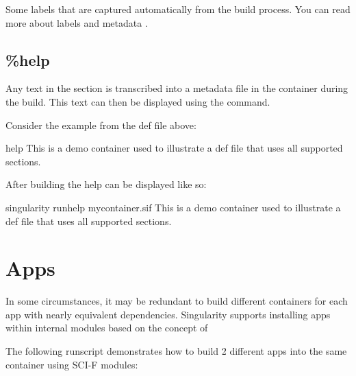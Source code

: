 \documentclass[letterpaper,10pt,english]{sphinxmanual}
\begin{document}
Some labels that are captured automatically from the build process. You can read
more about labels and metadata .


\subsection{\%help}
\label{\detokenize{definition_files:help}}
Any text in the  section is transcribed into a metadata file in the
container during the build. This text can then be displayed using the
 command.

Consider the example from the def file above:

%
\begin{sphinxVerbatim}[commandchars=\\\{\}]
\PYGZpc{}help
    This is a demo container used to illustrate a def file that uses all
    supported sections.
\end{sphinxVerbatim}

After building the help can be displayed like so:

%
\begin{sphinxVerbatim}[commandchars=\\\{\}]
\PYGZdl{} singularity run\PYGZhy{}help my\PYGZus{}container.sif
    This is a demo container used to illustrate a def file that uses all
    supported sections.
\end{sphinxVerbatim}


\section{Apps}
\label{\detokenize{definition_files:apps}}
In some circumstances, it may be redundant to build different containers for
each app with nearly equivalent dependencies. Singularity supports installing
apps within internal modules based on the concept of 

The following runscript demonstrates how to build 2 different apps into the
same container using SCI-F modules:
\end{document}
